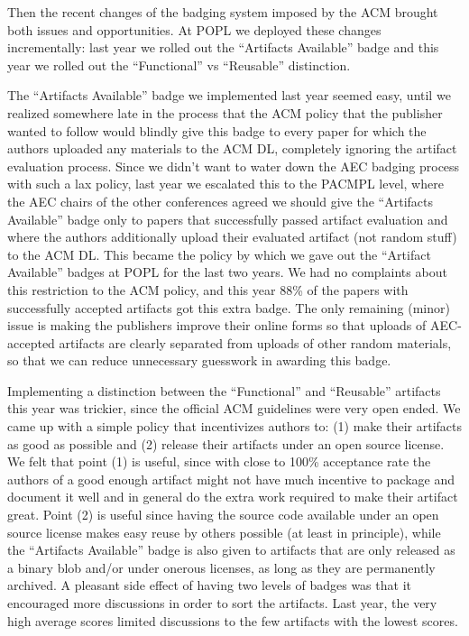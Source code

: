 Then the recent changes of the badging system imposed by the ACM
brought both issues and opportunities. At POPL we deployed these
changes incrementally: last year we rolled out the “Artifacts
Available” badge and this year we rolled out the “Functional” vs
“Reusable” distinction.

The “Artifacts Available” badge we implemented last year seemed easy,
until we realized somewhere late in the process that the ACM policy
that the publisher wanted to follow would blindly give this badge to
every paper for which the authors uploaded any materials to the ACM
DL, completely ignoring the artifact evaluation process. Since we
didn’t want to water down the AEC badging process with such a lax
policy, last year we escalated this to the PACMPL level, where the AEC
chairs of the other conferences agreed we should give the “Artifacts
Available” badge only to papers that successfully passed artifact
evaluation and where the authors additionally upload their evaluated
artifact (not random stuff) to the ACM DL. This became the policy by
which we gave out the “Artifact Available” badges at POPL for the last
two years. We had no complaints about this restriction to the ACM
policy, and this year 88\% of the papers with successfully accepted
artifacts got this extra badge. The only remaining (minor) issue is
making the publishers improve their online forms so that uploads of
AEC-accepted artifacts are clearly separated from uploads of other
random materials, so that we can reduce unnecessary guesswork in
awarding this badge.

Implementing a distinction between the “Functional” and “Reusable” artifacts
this year was trickier, since the official ACM guidelines were
very open ended. We came up with a simple policy that incentivizes authors to:
(1) make their artifacts as good as possible and (2) release their
artifacts under an open source license. We felt that point (1) is
useful, since with close to 100\% acceptance rate the authors of a
good enough artifact might not have much incentive to package and
document it well and in general do the extra work required to make
their artifact great. Point (2) is useful since having the source code
available under an open source license makes easy reuse by others
possible (at least in principle), while the “Artifacts Available”
badge is also %
given to artifacts that are only released as a binary
blob and/or under onerous licenses, as long as they are permanently
archived. A pleasant side effect of having two levels of badges was
that it encouraged more discussions in order to sort the
artifacts. Last year, the very high average scores limited discussions
to the few artifacts with the lowest scores.


